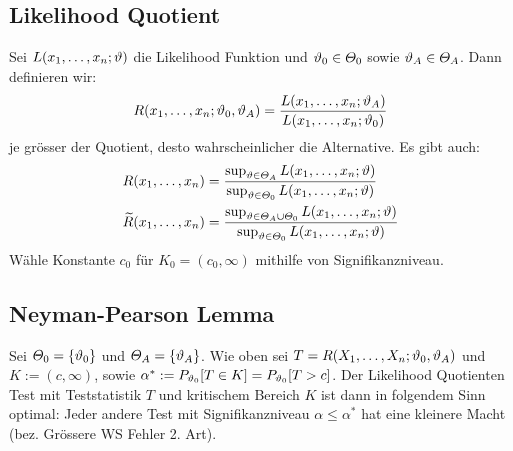 \subsection{Likelihood Quotient}
Sei $L (x_1, \dots, x_n; \vartheta)$ die Likelihood Funktion und $\vartheta_0 \in
  \varTheta_0$ sowie $\vartheta_A \in \varTheta_A$. Dann definieren wir:
\begin{align*}
  R (x_1, \dots, x_n; \vartheta_0, \vartheta_A) = \frac{L (x_1, \dots, x_n; \vartheta_A)}{L (x_1, \dots, x_n; \vartheta_0)}
\end{align*}
je grösser der Quotient, desto wahrscheinlicher die Alternative. Es gibt auch:
\begin{align*}
  R (x_1, \dots, x_n)             & = \frac{ \sup_{\vartheta \in \varTheta_A} L (x_1, \dots, x_n; \vartheta)}{\sup_{\vartheta \in \varTheta_0} L (x_1, \dots, x_n; \vartheta)}                  \\
  \widetilde{R} (x_1, \dots, x_n) & = \frac{ \sup_{\vartheta \in \varTheta_A \cup \varTheta_0} L (x_1, \dots, x_n; \vartheta)}{\sup_{\vartheta \in \varTheta_0} L (x_1, \dots, x_n; \vartheta)} \\
\end{align*}
Wähle Konstante $c_0$ für $K_0 =  (c_0, \infty)$ mithilfe von Signifikanzniveau.
\subsection{Neyman-Pearson Lemma}
Sei $\varTheta_0 = \{\vartheta_0\}$ und $\varTheta_A = \{\vartheta_A\}$. Wie oben sei $T =
  R (X_1, \dots, X_n; \vartheta_0, \vartheta_A)$ und $K := (c, \infty)$, sowie $\alpha^* :=
  P_{\vartheta_0}[T \in K] = P_{\vartheta_0}[T > c]$. Der Likelihood Quotienten Test mit
Teststatistik $T$ und kritischem Bereich $K$ ist dann in folgendem Sinn
optimal: Jeder andere Test mit Signifikanzniveau $\alpha \leq \alpha^*$ hat
eine kleinere Macht (bez. Grössere WS Fehler 2. Art).
